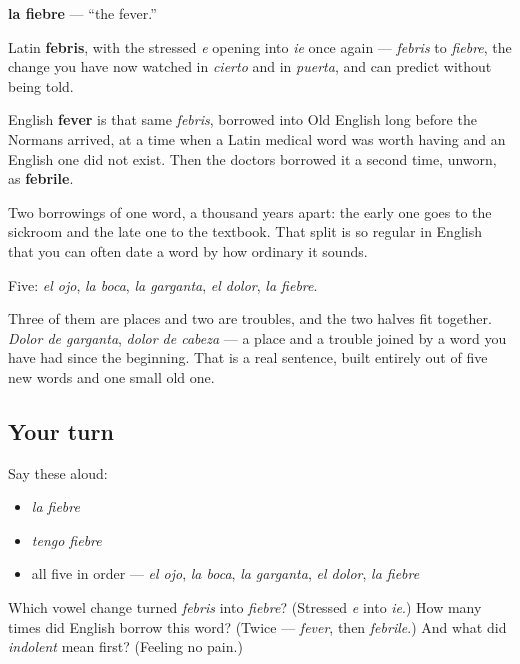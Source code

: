 \begin{cousinweb}
\textbf{la fiebre} — \textquotedblleft{}the fever.\textquotedblright{}

Latin \textbf{febris}, with the stressed \emph{e} opening into \emph{ie} once again — \emph{febris} to \emph{fiebre}, the change you have now watched in \emph{cierto} and in \emph{puerta}, and can predict without being told.

English \textbf{fever} is that same \emph{febris}, borrowed into Old English long before the Normans arrived, at a time when a Latin medical word was worth having and an English one did not exist. Then the doctors borrowed it a second time, unworn, as \textbf{febrile}.

Two borrowings of one word, a thousand years apart: the early one goes to the sickroom and the late one to the textbook. That split is so regular in English that you can often date a word by how ordinary it sounds.
\end{cousinweb}

\begin{grammarlens}[title={What you've built}]
Five: \emph{el ojo}, \emph{la boca}, \emph{la garganta}, \emph{el dolor}, \emph{la fiebre}.

Three of them are places and two are troubles, and the two halves fit together. \emph{Dolor de garganta}, \emph{dolor de cabeza} — a place and a trouble joined by a word you have had since the beginning. That is a real sentence, built entirely out of five new words and one small old one.
\end{grammarlens}

\subsection*{Your turn}
Say these aloud:

\begin{itemize}
\raggedright
  \item \emph{la fiebre}
  \item \emph{tengo fiebre}
  \item all five in order — \emph{el ojo}, \emph{la boca}, \emph{la garganta}, \emph{el dolor}, \emph{la fiebre}
\end{itemize}

\begin{tcolorbox}[breakable,colback=teal!4,colframe=teal!35!black,title={Before you move on}]
Which vowel change turned \emph{febris} into \emph{fiebre}? (Stressed \emph{e} into \emph{ie}.) How many times did English borrow this word? (Twice — \emph{fever}, then \emph{febrile}.) And what did \emph{indolent} mean first? (Feeling no pain.)
\end{tcolorbox}

